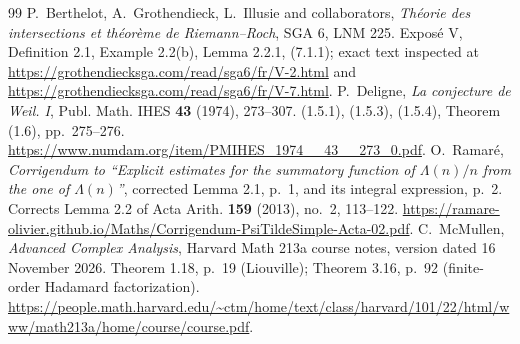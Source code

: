 \documentclass[11pt,a4paper]{article}
\begin{document}
\begin{thebibliography}{99}
 P.~Berthelot, A.~Grothendieck, L.~Illusie and collaborators, \emph{Th\'eorie des intersections et th\'eor\`eme de Riemann--Roch}, SGA 6, LNM 225. Expos\'e V, Definition 2.1, Example 2.2(b), Lemma 2.2.1, (7.1.1); exact text inspected at \url{https://grothendiecksga.com/read/sga6/fr/V-2.html} and \url{https://grothendiecksga.com/read/sga6/fr/V-7.html}.
 P.~Deligne, \emph{La conjecture de Weil. I}, Publ. Math. IHES \textbf{43} (1974), 273--307. (1.5.1), (1.5.3), (1.5.4), Theorem (1.6), pp.~275--276. \url{https://www.numdam.org/item/PMIHES_1974__43__273_0.pdf}.
 O.~Ramar\'e, \emph{Corrigendum to ``Explicit estimates for the summatory function of $\Lambda(n)/n$ from the one of $\Lambda(n)$''}, corrected Lemma 2.1, p.~1, and its integral expression, p.~2. Corrects Lemma 2.2 of Acta Arith. \textbf{159} (2013), no.~2, 113--122. \url{https://ramare-olivier.github.io/Maths/Corrigendum-PsiTildeSimple-Acta-02.pdf}.
 C.~McMullen, \emph{Advanced Complex Analysis}, Harvard Math 213a course notes, version dated 16 November 2026. Theorem 1.18, p.~19 (Liouville); Theorem 3.16, p.~92 (finite-order Hadamard factorization). \url{https://people.math.harvard.edu/~ctm/home/text/class/harvard/101/22/html/www/math213a/home/course/course.pdf}.
\end{thebibliography}
\end{document}
